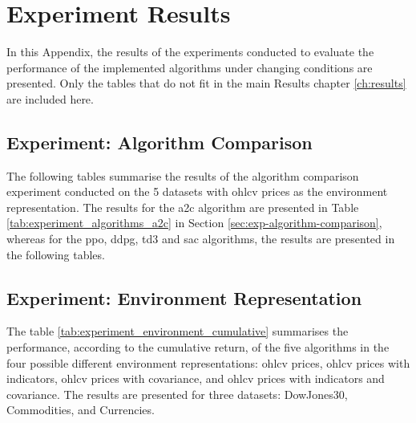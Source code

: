 \chapter{Experiment Results}

In this Appendix, the results of the experiments conducted to evaluate the performance of the implemented algorithms under changing conditions are presented. Only the tables that do not fit in the main Results chapter \ref{ch:results} are included here.

\section{Experiment: Algorithm Comparison} \label{app:experiment_algorithms_comparison}

The following tables summarise the results of the algorithm comparison experiment conducted on the 5 datasets with \acrshort{ohlcv} prices as the environment representation. The results for the \acrshort{a2c} algorithm are presented in Table \ref{tab:experiment_algorithms_a2c} in Section \ref{sec:exp-algorithm-comparison}, whereas for the \acrshort{ppo}, \acrshort{ddpg}, \acrshort{td3} and \acrshort{sac} algorithms, the results are presented in the following tables. 









\section{Experiment: Environment Representation} \label{app:experiment_environment_representation}

The table \ref{tab:experiment_environment_cumulative} summarises the performance, according to the cumulative return, of the five algorithms in the four possible different environment representations: \acrshort{ohlcv} prices, \acrshort{ohlcv} prices with indicators, \acrshort{ohlcv} prices with covariance, and \acrshort{ohlcv} prices with indicators and covariance. The results are presented for three datasets: DowJones30, Commodities, and Currencies. 



